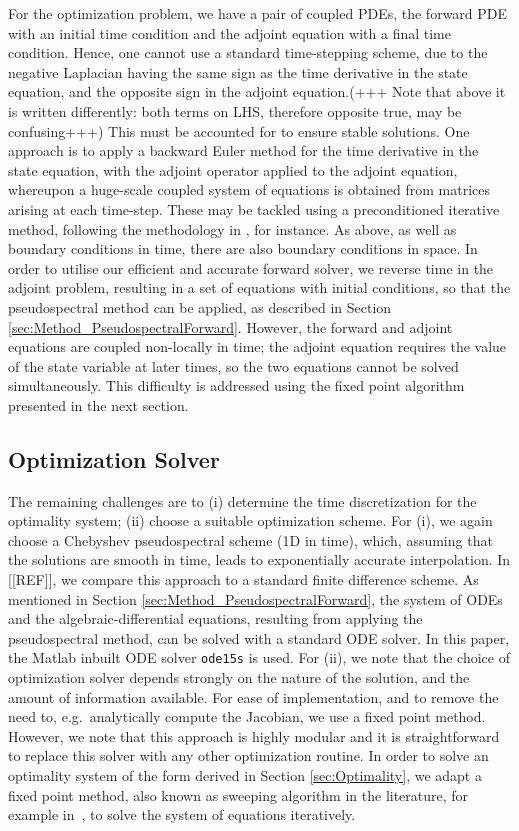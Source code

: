 For the optimization problem, we have a pair of coupled PDEs, the forward PDE with an initial time condition and the adjoint equation with a final time condition. Hence, one cannot use a standard time-stepping scheme, due to the negative Laplacian having the same sign as the time derivative
in the state equation, and the opposite sign in the adjoint equation.(+++ Note that above it is written differently: both terms on LHS, therefore opposite true, may be confusing+++)
This must be accounted for to ensure stable solutions. One approach
is to apply a backward Euler method for the time derivative in the state equation, with the adjoint operator applied to the adjoint equation, whereupon a huge-scale coupled
system of equations is obtained from matrices arising at each time-step. These may be tackled using a preconditioned iterative method, following the
methodology in \cite{PS13,PSW12,SW10}, for instance.  As above,
as well as boundary conditions in time, there are also boundary conditions in space.  In order to utilise our efficient and accurate forward solver, we reverse time in the adjoint problem, resulting in a set of equations with initial conditions, so that the pseudospectral method can be applied, as described in Section \ref{sec:Method_PseudospectralForward}. However, the forward and adjoint equations are coupled non-locally in time; the adjoint equation requires the value of the state variable at later times, so the two equations cannot be solved simultaneously. This difficulty is addressed using the fixed point algorithm presented in the next section.  

\subsection{Optimization Solver}\label{sec:Method_Solver}
The remaining challenges are to (i) determine the time discretization for the optimality system;
(ii) choose a suitable optimization scheme. For (i), we again choose a Chebyshev pseudospectral scheme (1D in time), which, assuming that the solutions are smooth in time, leads to exponentially accurate interpolation. In [[REF]], we compare this approach to a standard finite difference scheme. As mentioned in Section \ref{sec:Method_PseudospectralForward}, the system of ODEs and the algebraic-differential equations, resulting from applying the pseudospectral method, can be solved with a standard ODE solver. In this paper, the Matlab inbuilt ODE solver \texttt{ode15s} is used.
For (ii), we note that the choice of optimization solver depends strongly on the nature of the solution, and the amount of information available.  For ease of implementation, and to remove the 
need to, e.g.\ analytically compute the Jacobian, we use a fixed point method. However, we note that this approach is highly modular and it is straightforward to replace this solver with any other optimization routine.
In order to solve an optimality system of the form derived in Section \ref{sec:Optimality}, we adapt a fixed point method, also known as sweeping algorithm in the literature, for example in~\cite{ACFK}, to solve the system of equations iteratively. 
\\

